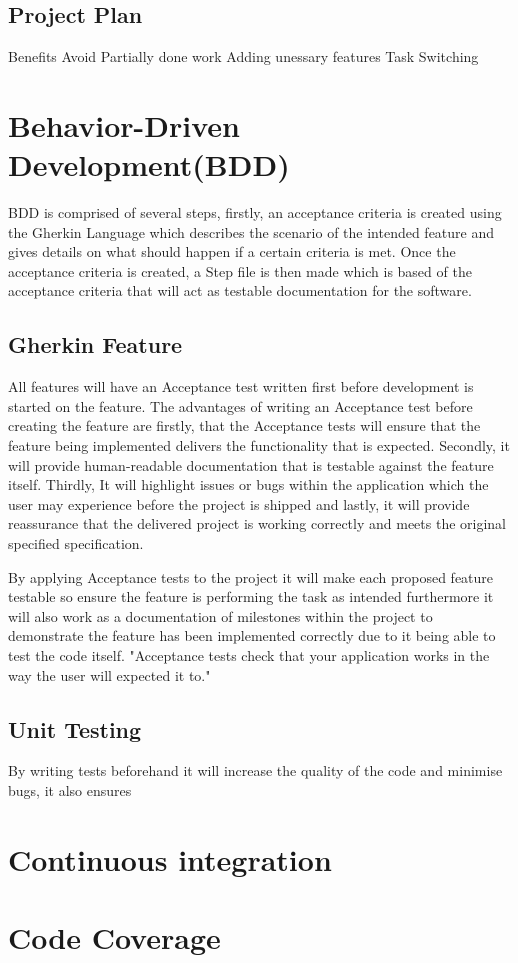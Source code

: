 \subsection{Project Plan}

Benefits
Avoid Partially done work
Adding unessary features
Task Switching


\section{Behavior-Driven Development(BDD)}
BDD is comprised of several steps, firstly, an acceptance criteria is created using the Gherkin Language which describes the scenario of the intended feature and gives details on what should happen if a certain criteria is met. 
Once the acceptance criteria is created, a Step file is then made which is based of the acceptance criteria that will act as testable documentation for the software.

\subsection{Gherkin Feature}
All features will have an Acceptance test written first before development is started on the feature. The advantages of writing an Acceptance test before creating the feature are firstly, that the Acceptance tests will ensure that the feature being implemented delivers the functionality that is expected. Secondly, it will provide human-readable documentation that is testable against the feature itself. Thirdly, It will highlight issues or bugs within the application which the user may experience before the project is shipped and lastly, it will provide reassurance that the delivered project is working correctly and meets the original specified specification.

By applying Acceptance tests to the project it will make each proposed feature testable so ensure the feature is performing the task as intended furthermore it will also work as a documentation of milestones within the project to demonstrate the feature has been implemented correctly due to it being able to test the code itself. "Acceptance tests check that your application works in the way the user will expected it to."\cite{sale2014testingpython}

\subsection{Unit Testing}
By writing tests beforehand it will increase the quality of the code and minimise bugs, it also ensures 
\section{Continuous integration}
\section{Code Coverage}
